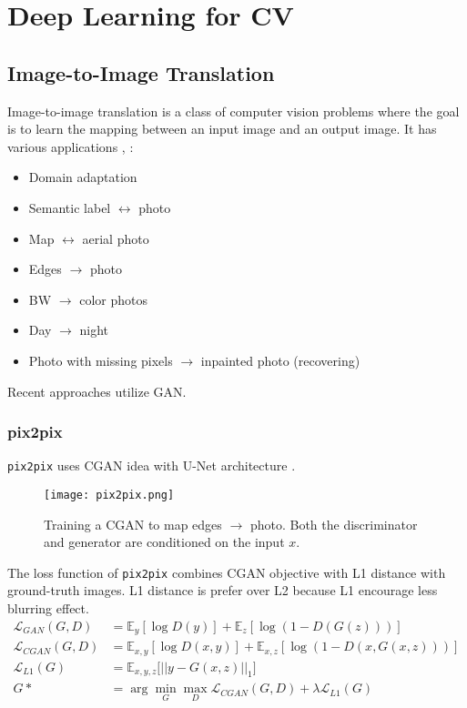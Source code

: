 \chapter{Deep Learning for CV}
\todo{}

\section{Image-to-Image Translation}
Image-to-image translation is a class of computer vision problems where the goal is to learn the mapping between an input image and an output image. It has various applications \cite{isola2017image, zhu2017unpaired}, \eg: 
\begin{itemize}
	\item Domain adaptation
	\item Semantic label $\leftrightarrow$ photo
	\item Map $\leftrightarrow$ aerial photo
	\item Edges $\rightarrow$ photo
	\item BW $\rightarrow$ color photos
	\item Day $\rightarrow$ night
	\item Photo with missing pixels $\rightarrow$ inpainted photo (recovering)
\end{itemize}
Recent approaches utilize \ac{GAN}.

\subsection{pix2pix}
\texttt{pix2pix} uses \ac{CGAN} idea with U-Net architecture \cite{isola2017image}.
\begin{figure}[hbt!]
	\centering
	\texttt{[image: pix2pix.png]}
	\caption{Training a \ac{CGAN} to map edges $\rightarrow$ photo. Both the discriminator and generator are conditioned on the input $x$. \cite{isola2017image}}
\end{figure}

The loss function of \texttt{pix2pix} combines \ac{CGAN} objective with L1 distance with ground-truth images. L1 distance is prefer over L2 because L1 encourage less blurring effect.
\begin{align}
	\mathcal{L}_{GAN}(G,D) &= \mathbb{E}_y [\log D(y)] + \mathbb{E}_z [\log (1-D(G(z)))]\\
	\mathcal{L}_{CGAN}(G,D) &= \mathbb{E}_{x,y} [\log D(x,y)] + \mathbb{E}_{x,z} [\log (1-D(x,G(x,z)))]\\
	\mathcal{L}_{L1}(G) &= \mathbb{E}_{x,y,z} \big[ ||y-G(x,z)||_1 \big]\\
	G* &= \arg \underset{G}{\min} \underset{D}{\max} \mathcal{L}_{CGAN}(G,D) + \lambda \mathcal{L}_{L1}(G)
\end{align}

